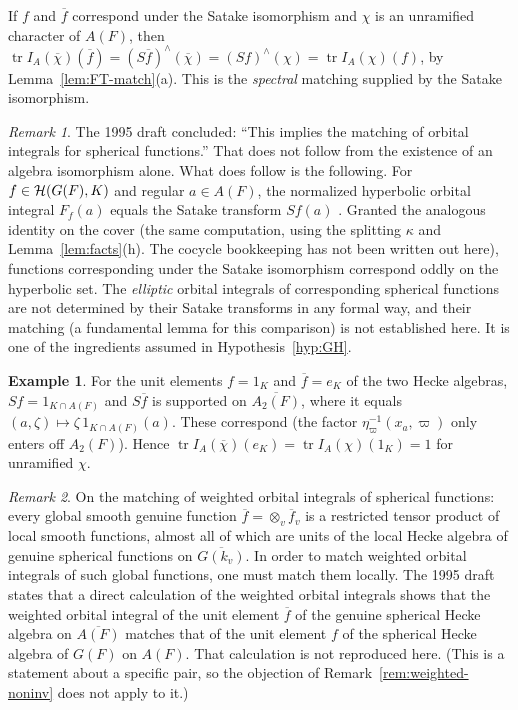 \documentclass[12pt,letterpaper]{book}
\theoremstyle{plain}
\theoremstyle{definition}
\newtheorem{example}[theorem]{Example}
\theoremstyle{remark}
\theoremstyle{remark}
\newtheorem{remyy}{Remark}
\newcommand{\tr}{\operatorname{tr}}
\begin{document}
If $f$ and $\overline f$ correspond under the Satake isomorphism and $\chi$ is
an unramified character of $A(F)$, then
$\tr I_A(\overline\chi)(\overline f)=(S\overline f)^\wedge(\overline\chi)
=(Sf)^\wedge(\chi)=\tr I_A(\chi)(f)$, by Lemma~\ref{lem:FT-match}(a).
This is the \emph{spectral} matching supplied by the Satake isomorphism.

\begin{remyy}\label{rem:satake-oi}
The 1995 draft concluded: ``This implies the matching of orbital
integrals for spherical functions.'' That does not follow from the
existence of an algebra isomorphism alone. What does follow is the
following. For $f\in{\cal H}(G(F),K)$ and regular $a\in A(F)$, the
normalized hyperbolic orbital integral $F_f(a)$ equals the Satake
transform $Sf(a)$ \cite{C}. Granted the analogous identity on the cover
(the same computation, using the splitting $\kappa$ and
Lemma~\ref{lem:facts}(h). The cocycle bookkeeping has not been written out
here), functions corresponding under the Satake isomorphism correspond
oddly on the hyperbolic set. The \emph{elliptic} orbital integrals of
corresponding spherical functions are not determined by their Satake
transforms in any formal way, and their matching (a fundamental lemma
for this comparison) is not established here. It is one of the
ingredients assumed in Hypothesis~\ref{hyp:GH}.
\end{remyy}

\begin{example}\label{ex:units}
For the unit elements $f=1_K$ and $\overline f=e_K$ of the two Hecke
algebras, $Sf=1_{K\cap A(F)}$ and $S\overline f$ is supported on
$\overline{A_2(F)}$, where it equals $(a,\zeta)\mapsto\zeta\,1_{K\cap A(F)}(a)$.
These correspond (the factor $\eta_\varpi^{-1}(x_a,\varpi)$ only enters off
$A_2(F)$). Hence $\tr I_A(\overline\chi)(e_K)=\tr I_A(\chi)(1_K)=1$ for
unramified $\chi$.
\end{example}

\begin{remyy}\label{rem:weighted-units}
On the matching of
weighted orbital integrals of spherical functions:
every global smooth genuine function
$\overline{f}=\otimes_v\overline{f}_v$ is a restricted tensor product
of local smooth functions, almost all of which are units of the
local Hecke algebra of genuine spherical functions on
$\overline{G(k_v)}$. In order to match weighted orbital integrals
of such global functions, one must match them locally.
The 1995 draft states that a direct calculation of the weighted orbital
integrals shows that the weighted orbital integral of the unit element
$\overline{f}$ of the genuine spherical Hecke algebra on $\overline{A(F)}$
matches that of the unit element $f$ of the spherical Hecke algebra of
$G(F)$ on $A(F)$. That calculation is not reproduced here. (This is a
statement about a specific pair, so the objection of
Remark~\ref{rem:weighted-noninv} does not apply to it.)
\end{remyy}
\end{document}
